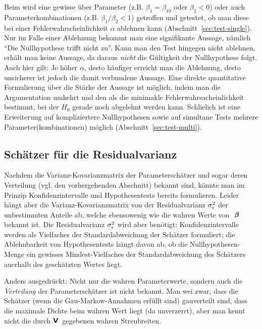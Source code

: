 \item Beim  
 wird eine gewisse
 \"uber Parameter (z.B. $\beta_1=\beta_{10}$
oder  $\beta_2<0$) oder auch Parameterkombinationen
(z.B. $\beta_1/\beta_2<1$)  
getroffen und getestet, ob man diese bei einer
Fehlerwahrscheinlichkeit $\alpha$ ablehnen kann
(Abschnitt~\ref{sec:test-single}). Nur im Falle einer
Ablehnung bekommt man eine signifikante Aussage, n\"amlich
 ``Die Nullhypothese trifft 
nicht zu''. Kann man den Test hingegen nicht ablehnen,
erh\"alt man keine Aussage, da daraus \textit{nicht} die  
G\"ultigkeit der Nullhypothese folgt. Auch hier gilt: Je
h\"oher $\alpha$, desto h\"aufiger erreicht man die Ablehnung, desto
unsicherer ist jedoch die damit verbundene Aussage. Eine direkte
quantitative Formulierung  \"uber die St\"arke der Aussage ist
m\"oglich, indem man die Argumentation umkehrt und den
 als die minimakle Fehlerwahrsacheinlichkeit
bestimmt, bei der $H_0$ gerade noch abgelehnt werden
kann. Schlie\3lich  ist eine
Erweiterung auf kompliziertere Nullhypothesen sowie auf simultane
Tests mehrere Parameter(kombinationen)
m\"oglich (Abschnitt~\ref{sec:test-multi}).
\ei



\subsection{\label{sec:resVarianz}Sch\"atzer f\"ur die Residualvarianz}

Nachdem die Varianz-Kovarianzmatrix der  Parametersch\"atzer und sogar
deren Verteilung (vgl. den
vorhergehenden Abschnitt)
bekannt sind, k\"onnte man im Prinzip Konfidenzintervalle und
Hypothesentests bereits formulieren. Leider 
h\"angt aber die Varianz-Kovarianzmatrix von
der Residualvarianz $\sigma_{\epsilon}^2$ der unbestimmten Anteile ab, welche
ebensowenig wie die wahren Werte von ${\mbox{ \boldmath{$\beta$}}}$ bekannt
ist. Die Residualvarianz $\sigma_{\epsilon}^2$ wird aber ben\"otigt: 
Konfidenzintervalle
werden als Vielfaches der Standardabweichung der Sch\"atzer formuliert;
die Ablehnbarkeit von Hypothesentests h\"angt davon ab, 
ob die Nullhypo\-the\-sen-Menge ein
gewisses Mindest-Vielfaches der Standardabweichung des Sch\"atzers
 au\3erhalb des gesch\"atzten Wertes liegt.

Anders ausgedr\"uckt: Nicht nur die wahren Parameterwerte, sondern auch die
\emph{Verteilung} der Parametersch\"atzer ist nicht bekannt. Man wei\3
zwar, dass die Sch\"atzer (wenn die Gau\3-Markow-Annahmen erf\"ullt
sind) 
gau\3verteilt sind, dass die maximale Dichte beim wahren Wert liegt
(da unverzerrt), aber man kennt nicht die durch $\textbf{\textsf{V}}\,$
gegebenen wahren Streubreiten.

